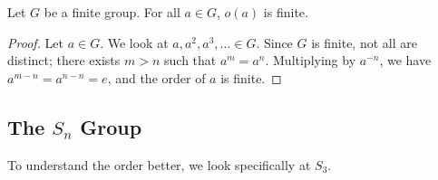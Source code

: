 \begin{proposition}
    Let $G$ be a finite group. For all $a \in G$, $o(a)$ is finite.
\end{proposition}
\begin{proof}
    Let $a \in G$. We look at $a,a^{2},a^{3},\ldots \in G$. Since $G$ is finite, not all are distinct; there exists $m > n$ such that $a^{m} = a^{n}$. Multiplying by $a^{-n}$, we have $a^{m-n} = a^{n-n} = e$, and the order of $a$ is finite.
\end{proof}

\subsection{The $S_{n}$ Group}
To understand the order better, we look specifically at $S_{3}$.

